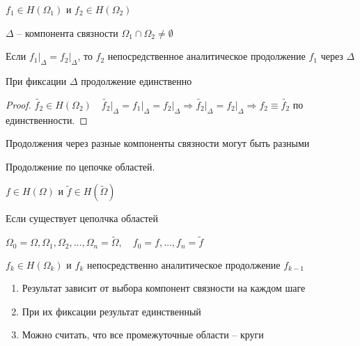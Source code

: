 
\begin{definition}\thmslashn
	
	$f_1 \in H(\Omega_1)$ и $f_2 \in H(\Omega_2)$
	
	$\Delta$ -- компонента связности $\Omega_1 \cap \Omega_2 \not = \emptyset$
	
	Если $f_1\Big|_{\Delta} = f_2\Big|_{\Delta}$, то $f_2$ непосредственное аналитическое продолжение $f_1$ через $\Delta$
	
\end{definition}

\begin{remark}\thmslashn

	При фиксации $\Delta$ продолжение единственно

\end{remark}

\begin{proof}\thmslashn
	
	$\widetilde{f_2} \in H(\Omega_2)\quad \widetilde{f_2}\Big|_{\Delta} = f_1\Big|_{\Delta} = f_2\Big|_{\Delta} \Rightarrow \widetilde{f_2}\Big|_{\Delta} = f_2\Big|_{\Delta} \Rightarrow f_2 \equiv \widetilde{f_2}$ по единственности.
	
\end{proof}


\begin{remark}\thmslashn
	
	Продолжения через разные компоненты связности могут быть разными

\end{remark}


\begin{definition}Продолжение по цепочке областей.
	
	$f\in H(\Omega)$ и $\widetilde{f} \in H(\widetilde{\Omega})$ 
	
	Если существует цеполчка областей
	
	$\Omega_0 = \Omega, \Omega_1, \Omega_2, \ldots, \Omega_n = \widetilde{\Omega}, \quad f_0 = f, \ldots, f_n = \widetilde{f}$
	
	$f_k \in H(\Omega_k)$ и $f_k$ непосредственно аналитическое продолжение $f_{k-1}$
	
\end{definition}

\begin{remarks}\thmslashn
	
	\begin{enumerate}
		\item 
		Результат зависит от выбора компонент связности на каждом шаге
		
		\item
		При их фиксации результат единственный
		
		\item
		Можно считать, что все промежуточные области -- круги
		
	\end{enumerate}
	
\end{remarks}


